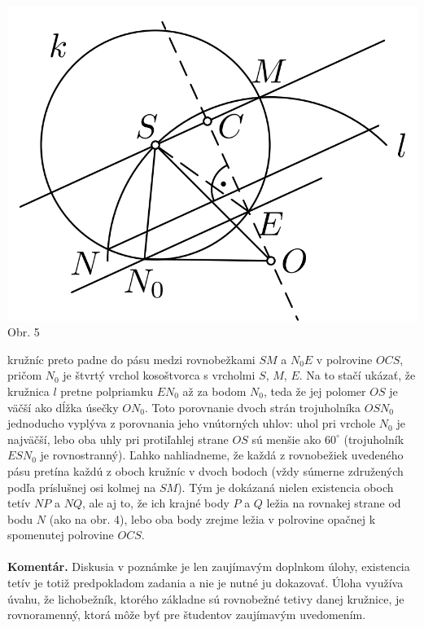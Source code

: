 \documentclass[11pt,a4paper,oneside,final]{book}
\newcommand{\kom}{\textbf{Komentár.} }
\begin{document}
\begin{center}
\includegraphics{59K32}\\

Obr. 5
\end{center}
kružníc preto padne do pásu medzi rovnobežkami $SM$ a $N_0 E$ v polrovine $OCS$, pričom $N_0$ je štvrtý vrchol kosoštvorca s vrcholmi $S$, $M$, $E$. Na to stačí ukázať, že kružnica $l$ pretne polpriamku $EN_0$ až za bodom $N_0$, teda že jej polomer $OS$ je väčší ako dĺžka úsečky $ON_0$. Toto porovnanie dvoch strán trojuholníka $OSN_0$ jednoducho vyplýva z porovnania jeho vnútorných uhlov: uhol pri vrchole $N_0$ je najväčší, lebo oba uhly pri protiľahlej strane $OS$ sú menšie ako $60^\circ$ (trojuholník $ESN_0$ je rovnostranný). Ľahko nahliadneme, že každá z rovnobežiek uvedeného pásu pretína každú z oboch kružníc v dvoch bodoch (vždy súmerne združených podľa príslušnej osi kolmej na $SM$). Tým je dokázaná nielen existencia oboch tetív $NP$ a $NQ$, ale aj to, že ich krajné body $P$ a $Q$ ležia na rovnakej strane od bodu $N$ (ako na obr. 4), lebo oba body zrejme ležia v polrovine opačnej k spomenutej polrovine $OCS$.\\
\\
\kom Diskusia v poznámke je len zaujímavým doplnkom úlohy, existencia tetív je totiž predpokladom zadania a nie je nutné ju dokazovať. Úloha využíva úvahu, že lichobežník, ktorého základne sú rovnobežné tetivy danej kružnice, je rovnoramenný, ktorá môže byť pre študentov zaujímavým uvedomením.\\
\\
\end{document}
